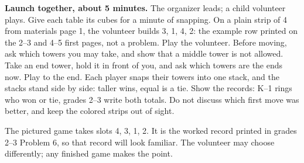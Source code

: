\documentclass[11pt]{article}
\newcommand{\slots}[2]{%
  \foreach \i in {1,...,#2}{\draw[thick,fill=white] ({#1+(\i-1)*7},0) rectangle ++(7,4);
    \node[font=\scriptsize] at ({#1+(\i-1)*7+3.5},2) {\i};}}
\newcommand{\tower}[3]{%
  \foreach \k in {1,...,#3}{\draw[fill=black!14] ({#1-1.75},{#2+(\k-1)*3.5}) rectangle ++(3.5,3.5);}}
\begin{document}
\textbf{Launch together, about 5 minutes.} The organizer leads; a child volunteer plays. Give each table its cubes for a minute of snapping. On a plain strip of 4 from materials page 1, the volunteer builds 3, 1, 4, 2: the example row printed on the 2--3 and 4--5 first pages, not a problem. Play the volunteer. Before moving, ask which towers you may take, and show that a middle tower is not allowed. Take an end tower, hold it in front of you, and ask which towers are the ends now. Play to the end. Each player snaps their towers into one stack, and the stacks stand side by side: taller wins, equal is a tie. Show the records: K--1 rings who won or tie, grades 2--3 write both totals. Do not discuss which first move was better, and keep the colored strips out of sight.
\begin{center}
\end{center}
The pictured game takes slots 4, 3, 1, 2. It is the worked record printed in grades 2--3 Problem 6, so that record will look familiar. The volunteer may choose differently; any finished game makes the point.
\end{document}
